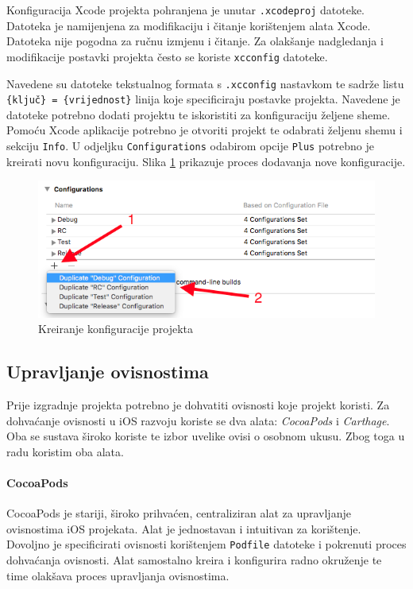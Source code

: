 \documentclass[times, utf8, diplomski, numeric]{fer}
\begin{document}
Konfiguracija Xcode projekta pohranjena je unutar \verb|.xcodeproj| datoteke. Datoteka je namijenjena za modifikaciju i čitanje korištenjem alata Xcode. Datoteka nije pogodna za ručnu izmjenu i čitanje. Za olakšanje nadgledanja i modifikacije postavki projekta često se koriste \verb|xcconfig| datoteke.

Navedene su datoteke tekstualnog formata s \verb|.xcconfig| nastavkom te sadrže listu \verb|{ključ} = {vrijednost}| linija koje specificiraju postavke projekta. Navedene je datoteke potrebno dodati projektu te iskoristiti za konfiguraciju željene sheme. Pomoću Xcode aplikacije potrebno je otvoriti projekt te odabrati željenu shemu i sekciju \verb|Info|. U odjeljku \verb|Configurations| odabirom opcije \verb|Plus| potrebno je kreirati novu konfiguraciju. Slika \ref{fig:XcodeConfigurations} prikazuje proces dodavanja nove konfiguracije.

\begin{figure}[h!]
\centering
\includegraphics[scale=0.7]{XcodeConfigurations}
\caption{Kreiranje konfiguracije projekta}
\label{fig:XcodeConfigurations}
\end{figure}

\subsection{Upravljanje ovisnostima}

Prije izgradnje projekta potrebno je dohvatiti ovisnosti koje projekt koristi. Za dohvaćanje ovisnosti u iOS razvoju koriste se dva alata: \textit{CocoaPods} i \textit{Carthage}. Oba se sustava široko koriste te izbor uvelike ovisi o osobnom ukusu. Zbog toga u radu koristim oba alata.

\paragraph{CocoaPods}

CocoaPods je stariji, široko prihvaćen, centraliziran alat za upravljanje ovisnostima iOS projekata. Alat je jednostavan i intuitivan za korištenje. Dovoljno je specificirati ovisnosti korištenjem \verb|Podfile| datoteke i pokrenuti proces dohvaćanja ovisnosti. Alat samostalno kreira i konfigurira radno okruženje te time olakšava proces upravljanja ovisnostima.
\end{document}
